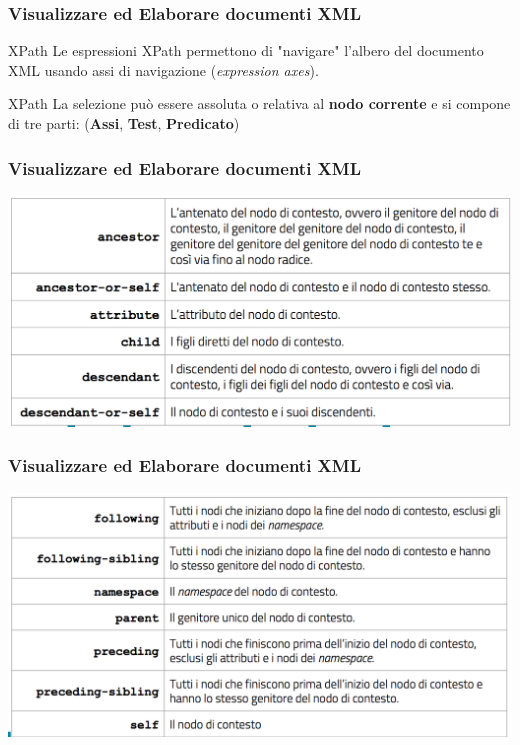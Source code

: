 \begin{frame}
    \frametitle{Visualizzare ed Elaborare documenti XML}
    \addtocounter{nframe}{1}
    

    \begin{block}{XPath}
        Le espressioni XPath permettono di "navigare" l'albero del documento XML usando assi di navigazione (\textit{expression axes}).
    \end{block}

    \begin{block}{XPath}
        La selezione può essere assoluta o relativa al \textbf{nodo corrente} e si compone di tre parti: (\textbf{Assi}, \textbf{Test}, \textbf{Predicato})
    \end{block}
    
\end{frame}

\begin{frame}
    \frametitle{Visualizzare ed Elaborare documenti XML}
    \addtocounter{nframe}{1}
    
    \begin{center}
        \includegraphics[width=.9\textwidth]{imgs/Schema-Assi-1.png}
    \end{center}

\end{frame}

\begin{frame}
    \frametitle{Visualizzare ed Elaborare documenti XML}
    \addtocounter{nframe}{1}
    
    \begin{center}
        \includegraphics[width=.9\textwidth]{imgs/Schema-Assi-2.png}
    \end{center}

\end{frame}

